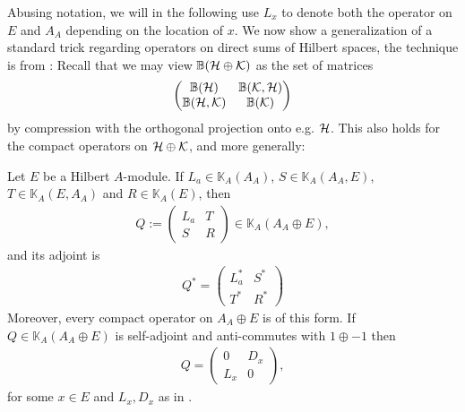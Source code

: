 Abusing notation, we will in the following use $L_x$ to denote both the operator on $E$ and $A_A$ depending on the location of $x$. We now show a generalization of a standard trick regarding operators on direct sums of Hilbert spaces, the technique is from \cite{blanchard1996deformations}: Recall that we may view $\mathbb{B}(\mathcal{H} \oplus \mathcal{K})$ as the set of matrices
\begin{align*}
	\begin{pmatrix}
		\mathbb{B}(\mathcal{H}) & \mathbb{B}(\mathcal{K},\mathcal{H})\\
		\mathbb{B}(\mathcal{H},\mathcal{K}) &   \mathbb{B}(\mathcal{K})
	\end{pmatrix}
\end{align*}
by compression with the orthogonal projection onto e.g. $\mathcal{H}$. This also holds for the compact operators on $\mathcal{H} \oplus \mathcal{K}$, and more generally:
\begin{lemma}
	Let $E$ be a Hilbert $A$-module. If $L_a \in \mathbb{K}_A(A_A)$, $S \in \mathbb{K}_A(A_A,E)$, $T \in \mathbb{K}_A(E,A_A)$ and $R \in \mathbb{K}_A(E)$, then
	\begin{align*}
		Q := \begin{pmatrix}
			L_a & T \\
			S & R
		\end{pmatrix}\in \mathbb{K}_A(A_A \oplus E),
	\end{align*}
	and its adjoint is
	\begin{align*}
		Q^* = \begin{pmatrix}
			L_a^* & S^* \\
			T^* & R^*
		\end{pmatrix}
	\end{align*}
	Moreover, every compact operator on $A_A \oplus E$ is of this form. If $Q \in \mathbb{K}_A(A_A \oplus E)$ is self-adjoint and anti-commutes with $1 \oplus -1$ then
	\begin{align*}
		Q = \begin{pmatrix}
			0 & D_x \\
			L_x  & 0
		\end{pmatrix},
	\end{align*}
	for some $x \in E$ and $L_x, D_x$ as in .
	\label{mult:2x2trick}
\end{lemma}
